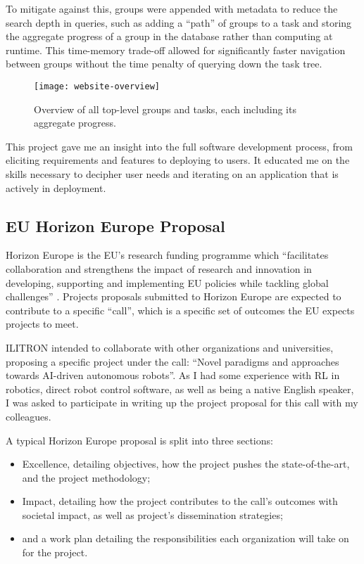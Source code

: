 To mitigate against this, groups were appended with metadata to reduce the search depth
in queries, such as adding a \enquote{path} of groups to a task and storing the aggregate progress
of a group in the database rather than computing at runtime. This time-memory trade-off allowed for
significantly faster navigation between groups without the time penalty of querying down the task
tree.

\begin{figure}
    \centering
    \texttt{[image: website-overview]}
    \caption{Overview of all top-level groups and tasks, each including its aggregate
        progress.\label{fig:website-overview}}
\end{figure}

This project gave me an insight into the full software development process, from eliciting
requirements and features to deploying to users. It educated me on the skills necessary to decipher
user needs and iterating on an application that is actively in deployment.

\subsection{EU Horizon Europe Proposal}
\label{sec:eu-proposal}

Horizon Europe is the EU's research funding programme which \enquote{facilitates collaboration and
    strengthens the impact of research and innovation in developing, supporting and implementing EU
    policies while tackling global challenges} \autocite{horizoneurope}. Projects proposals
submitted to Horizon Europe are expected to contribute to a specific \enquote{call}, which is a
specific set of outcomes the EU expects projects to meet.

ILITRON intended to collaborate with other organizations and universities, proposing a specific
project under the call: \enquote{Novel paradigms and approaches towards AI-driven autonomous
    robots}. As I had some experience with RL in robotics, direct robot control software, as well as
being a native English speaker, I was asked to participate in writing up the project proposal for
this call with my colleagues.

A typical Horizon Europe proposal is split into three sections:

\begin{itemize}
    \item Excellence, detailing objectives, how the project pushes the state-of-the-art, and the
          project methodology;
    \item Impact, detailing how the project contributes to the call's outcomes with societal
          impact, as well as project's dissemination strategies;
    \item and a work plan detailing the responsibilities each organization will take on for the
          project.
\end{itemize}

